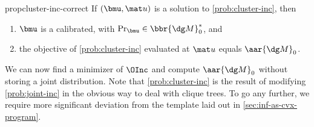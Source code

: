 \begin{linked}{prop}{cluster-inc-correct}
    If $(\bmu, \mat u)$ is a solution to \eqref{prob:cluster-inc}, then
    \vspace{-1ex}
    \begin{enumerate}[label={(\alph*)},nosep]
    \item $\bmu$ is a calibrated, with $\Pr_{\bmu} \in \bbr{\dg M}^*_0$, and
    \item the objective of \eqref{prob:cluster-inc} evaluated at $\mat u$ equals $\aar{\dg M}_0$.
    \end{enumerate}
\end{linked}
%
We can now find a minimizer of $\OInc$ and
compute $\aar{\dg M}_0$ without storing a joint distribution.
Note that
\eqref{prob:cluster-inc} is the result of modifying \eqref{prob:joint-inc} in the obvious way to deal with clique trees.
To go any further, we require more significant deviation from the template laid out in \cref{sec:inf-as-cvx-program}.

